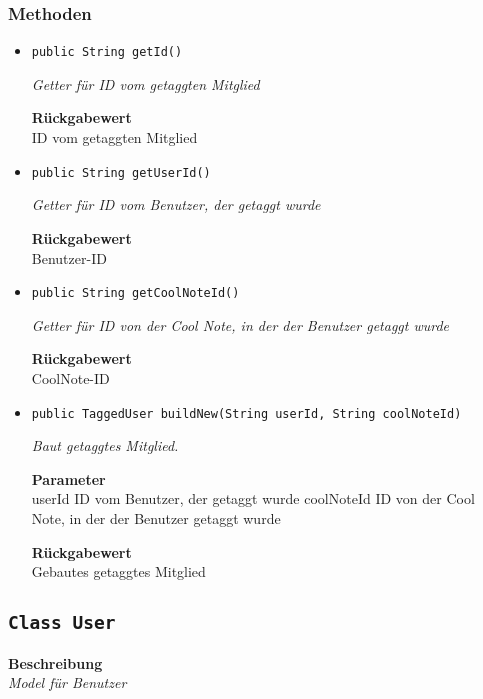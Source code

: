     \subsubsection{Methoden}
    \begin{itemize}
    	\item{\texttt{public String getId()}}
    	
    	\textit{Getter für ID vom getaggten Mitglied}
    	
    	
    	
    	\textbf{Rückgabewert} \\
    	ID vom getaggten Mitglied        \item{\texttt{public String getUserId()}}
    	
    	\textit{Getter für ID vom Benutzer, der getaggt wurde}
    	
    	
    	
    	\textbf{Rückgabewert} \\
    	Benutzer-ID        \item{\texttt{public String getCoolNoteId()}}
    	
    	\textit{Getter für ID von der Cool Note, in der der Benutzer getaggt wurde}
    	
    	
    	
    	\textbf{Rückgabewert} \\
    	CoolNote-ID        \item{\texttt{public TaggedUser buildNew(String userId, String coolNoteId)}}
    	
    	\textit{Baut getaggtes Mitglied.}
    	
    	\textbf{Parameter} \\
    	userId ID vom Benutzer, der getaggt wurde
    	coolNoteId ID von der Cool Note, in der der Benutzer getaggt wurde
    	
    	\textbf{Rückgabewert} \\
    	Gebautes getaggtes Mitglied
    \end{itemize}
    \subsection{\texttt{Class User}}
    \textbf{Beschreibung} \\
    \textit{Model für Benutzer}
